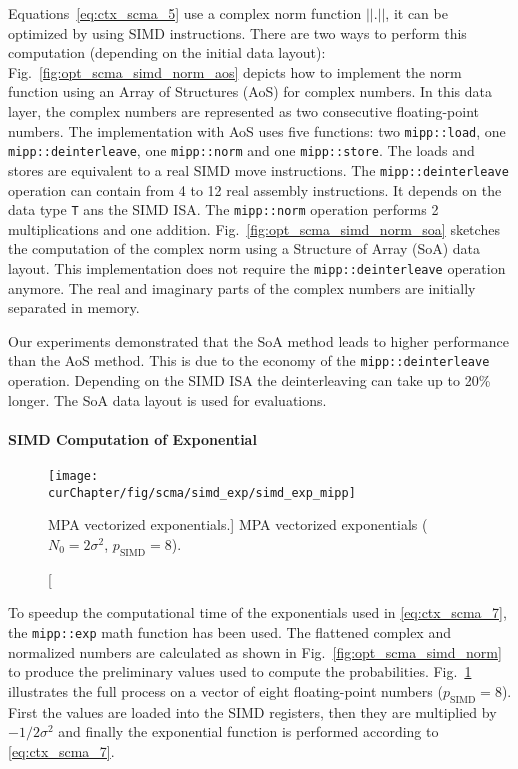 Equations~\eqref{eq:ctx_scma_5} use a complex norm function $||.||$, it can be
optimized by using SIMD instructions. There are two ways to perform this
computation (depending on the initial data layout):
Fig.~\ref{fig:opt_scma_simd_norm_aos} depicts how to implement the norm function
using an Array of Structures (AoS) for complex numbers. In this data layer, the
complex numbers are represented as two consecutive floating-point numbers. The
implementation with AoS uses five \MIPP functions: two \verb|mipp::load|, one
\verb|mipp::deinterleave|, one \verb|mipp::norm| and one \verb|mipp::store|.
The \MIPP loads and stores are equivalent to a real SIMD move instructions.
The \verb|mipp::deinterleave| operation can contain from 4 to 12 real assembly
instructions. It depends on the data type \verb|T| ans the SIMD ISA. The
\verb|mipp::norm| operation performs 2 multiplications and one addition.
Fig.~\ref{fig:opt_scma_simd_norm_soa} sketches the computation of the complex
norm using a Structure of Array (SoA) data layout. This implementation does
not require the \MIPP \verb|mipp::deinterleave| operation anymore. The real
and imaginary parts of the complex numbers are initially separated in memory.

Our experiments demonstrated that the SoA method leads to higher performance
than the AoS method. This is due to the economy of the \verb|mipp::deinterleave|
operation. Depending on the SIMD ISA the deinterleaving can take up to 20\%
longer. The SoA data layout is used for evaluations.

\paragraph{SIMD Computation of Exponential}

\begin{figure}[htp]
  \centering
  \texttt{[image: \\curChapter/fig/scma/simd\_exp/simd\_exp\_mipp]}
  \caption
    [MPA vectorized exponentials.]
    {MPA vectorized exponentials ($N_0 = 2\sigma^2$, $p_\text{SIMD} = 8$).}
  \label{fig:opt_scma_simd_exp}
\end{figure}

To speedup the computational time of the exponentials used in
\eqref{eq:ctx_scma_7}, the \verb|mipp::exp| math function has been used. The
flattened complex and normalized numbers are calculated as shown in
Fig.~\ref{fig:opt_scma_simd_norm} to produce the preliminary values used to
compute the probabilities. Fig.~\ref{fig:opt_scma_simd_exp} illustrates the full
process on a vector of eight floating-point numbers ($p_\text{SIMD} = 8$). First
the values are loaded into the SIMD registers, then they are multiplied by
$-1/2\sigma^2$ and finally the exponential function is performed according to
\eqref{eq:ctx_scma_7}.

